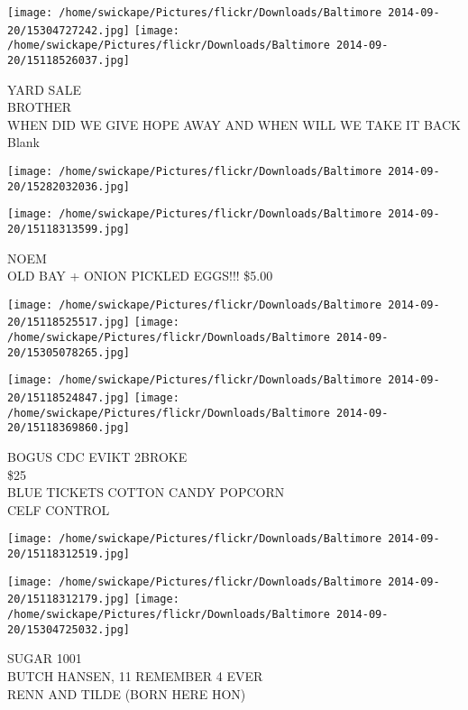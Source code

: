 \documentclass[10pt,letterpaper]{article}
\begin{document}
\texttt{[image: /home/swickape/Pictures/flickr/Downloads/Baltimore 2014-09-20/15304727242.jpg]}
\texttt{[image: /home/swickape/Pictures/flickr/Downloads/Baltimore 2014-09-20/15118526037.jpg]}

YARD SALE\\
BROTHER\\
WHEN DID WE GIVE HOPE AWAY AND WHEN WILL WE TAKE IT BACK\\
Blank\\
\pagebreak

\texttt{[image: /home/swickape/Pictures/flickr/Downloads/Baltimore 2014-09-20/15282032036.jpg]}

\vspace{0.25in}
\texttt{[image: /home/swickape/Pictures/flickr/Downloads/Baltimore 2014-09-20/15118313599.jpg]}

NOEM\\
OLD BAY + ONION PICKLED EGGS!!! \$5.00\\
\pagebreak

\texttt{[image: /home/swickape/Pictures/flickr/Downloads/Baltimore 2014-09-20/15118525517.jpg]}
\texttt{[image: /home/swickape/Pictures/flickr/Downloads/Baltimore 2014-09-20/15305078265.jpg]}

\texttt{[image: /home/swickape/Pictures/flickr/Downloads/Baltimore 2014-09-20/15118524847.jpg]}
\texttt{[image: /home/swickape/Pictures/flickr/Downloads/Baltimore 2014-09-20/15118369860.jpg]}

BOGUS CDC EVIKT 2BROKE\\
\$25\\
BLUE TICKETS COTTON CANDY POPCORN\\
CELF CONTROL\\
\pagebreak

\texttt{[image: /home/swickape/Pictures/flickr/Downloads/Baltimore 2014-09-20/15118312519.jpg]}

\vspace{0.25in}
\texttt{[image: /home/swickape/Pictures/flickr/Downloads/Baltimore 2014-09-20/15118312179.jpg]}
\texttt{[image: /home/swickape/Pictures/flickr/Downloads/Baltimore 2014-09-20/15304725032.jpg]}

SUGAR 1001\\
BUTCH HANSEN, 11 REMEMBER 4 EVER\\
RENN AND TILDE (BORN HERE HON)\\
\pagebreak
\end{document}
